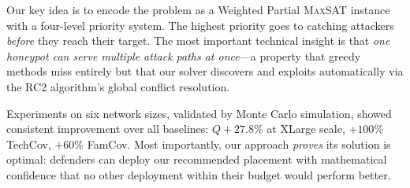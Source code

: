 \documentclass[journal]{IEEEtran}
\newcommand{\maxsat}{\textsc{MaxSAT}}
\begin{document}
Our key idea is to encode the problem as a Weighted Partial
\maxsat{} instance with a four-level priority system.
The highest priority goes to catching attackers \emph{before}
they reach their target.
The most important technical insight is that \emph{one
honeypot can serve multiple attack paths at once}---a
property that greedy methods miss entirely but that our
solver discovers and exploits automatically via the RC2
algorithm's global conflict resolution.

Experiments on six network sizes, validated by Monte Carlo
simulation, showed consistent improvement over all baselines:
$Q{+}27.8\%$ at XLarge scale, $+100\%$ TechCov, $+60\%$
FamCov.
Most importantly, our approach \emph{proves} its solution is
optimal: defenders can deploy our recommended placement with
mathematical confidence that no other deployment within their
budget would perform better.
\end{document}
